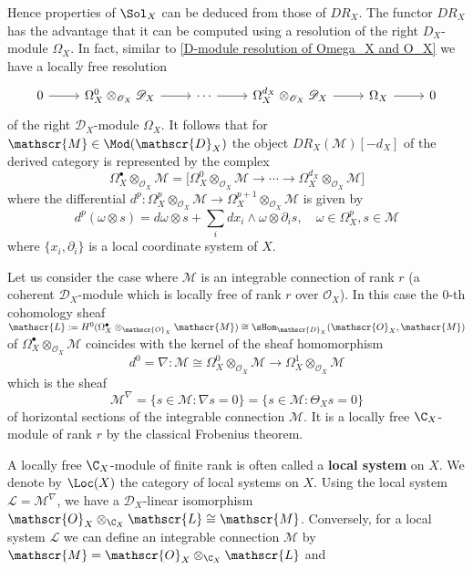 Hence properties of $\Sol_X$ can be deduced from those of $DR_X$. The functor $DR_X$ has the advantage that it can be computed using a resolution of the right $D_X$-module $\Omega_X$. In fact, similar to \cref{D-module resolution of Omega_X and O_X} we have a locally free resolution
\[\begin{tikzcd}
0\ar[r]&\Omega_X^0\otimes_{\mathscr{O}_X}\mathscr{D}_X\ar[r]&\cdots\ar[r]&\Omega_X^{d_X}\otimes_{\mathscr{O}_X}\mathscr{D}_X\ar[r]&\Omega_X\ar[r]&0
\end{tikzcd}\]
of the right $\mathscr{D}_X$-module $\Omega_X$. It follows that for $\mathscr{M}\in\Mod(\mathscr{D}_X)$ the object $DR_X(\mathscr{M})[-d_X]$ of the derived category is represented by the complex
\[\Omega_X^\bullet\otimes_{\mathscr{O}_X}\mathscr{M}=\big[\Omega_X^0\otimes_{\mathscr{O}_X}\mathscr{M}\to\cdots\to \Omega_X^{d_X}\otimes_{\mathscr{O}_X}\mathscr{M}\big]\]
where the differential $d^p:\Omega_X^p\otimes_{\mathscr{O}_X}\mathscr{M}\to\Omega_X^{p+1}\otimes_{\mathscr{O}_X}\mathscr{M}$ is given by
\[d^p(\omega\otimes s)=d\omega\otimes s+\sum_idx_i\wedge\omega\otimes\partial_is,\quad \omega\in\Omega_X^p,s\in\mathscr{M}\]
where $\{x_i,\partial_i\}$ is a local coordinate system of $X$.\par
Let us consider the case where $\mathscr{M}$ is an integrable connection of rank $r$ (a coherent $\mathscr{D}_X$-module which is locally free of rank $r$ over $\mathscr{O}_X$). In this case the $0$-th cohomology sheaf $\mathscr{L}:=H^0(\Omega_X^\bullet\otimes_{\mathscr{O}_X}\mathscr{M})\cong\sHom_{\mathscr{D}_X}(\mathscr{O}_X,\mathscr{M})$ of $\Omega_X^\bullet\otimes_{\mathscr{O}_X}\mathscr{M}$ coincides with the kernel of the sheaf homomorphism
\[d^0=\nabla:\mathscr{M}\cong\Omega_X^0\otimes_{\mathscr{O}_X}\mathscr{M}\to\Omega_X^1\otimes_{\mathscr{O}_X}\mathscr{M}\]
which is the sheaf
\[\mathscr{M}^\nabla=\{s\in\mathscr{M}:\nabla s=0\}=\{s\in\mathscr{M}:\Theta_Xs=0\}\]
of horizontal sections of the integrable connection $\mathscr{M}$. It is a locally free $\C_X$-module of rank $r$ by the classical Frobenius theorem.\par
A locally free $\C_X$-module of finite rank is often called a \textbf{local system} on $X$. We denote by $\Loc(X)$ the category of local systems on $X$. Using the local system $\mathscr{L}=\mathscr{M}^\nabla$, we have a $\mathscr{D}_X$-linear isomorphism $\mathscr{O}_X\otimes_{\C_X}\mathscr{L}\cong\mathscr{M}$. Conversely, for a local system $\mathscr{L}$ we can define an integrable connection $\mathscr{M}$ by $\mathscr{M}=\mathscr{O}_X\otimes_{\C_X}\mathscr{L}$ and 
